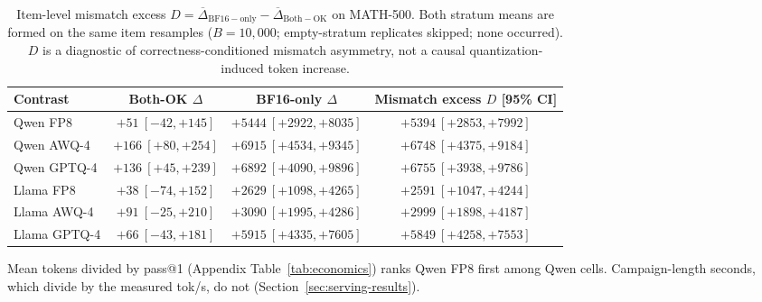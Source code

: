 \documentclass[11pt,a4paper]{article}
\begin{document}
\begin{table}[t]
\centering
\caption{Item-level mismatch excess $D=\overline{\Delta}_{\mathrm{BF16-only}}-\overline{\Delta}_{\mathrm{Both-OK}}$ on MATH-500. Both stratum means are formed on the same item resamples ($B=10{,}000$; empty-stratum replicates skipped; none occurred). $D$ is a diagnostic of correctness-conditioned mismatch asymmetry, not a causal quantization-induced token increase.}
\label{tab:mismatch-excess}
\small
\begin{tabular}{lccc}
\toprule
\textbf{Contrast} & \textbf{Both-OK $\Delta$} & \textbf{BF16-only $\Delta$} & \textbf{Mismatch excess $D$ [95\% CI]} \\
\midrule
Qwen FP8     & $+51\ [-42,+145]$ & $+5444\ [+2922,+8035]$ & $+5394\ [+2853,+7992]$ \\
Qwen AWQ-4   & $+166\ [+80,+254]$ & $+6915\ [+4534,+9345]$ & $+6748\ [+4375,+9184]$ \\
Qwen GPTQ-4  & $+136\ [+45,+239]$ & $+6892\ [+4090,+9896]$ & $+6755\ [+3938,+9786]$ \\
Llama FP8    & $+38\ [-74,+152]$ & $+2629\ [+1098,+4265]$ & $+2591\ [+1047,+4244]$ \\
Llama AWQ-4  & $+91\ [-25,+210]$ & $+3090\ [+1995,+4286]$ & $+2999\ [+1898,+4187]$ \\
Llama GPTQ-4 & $+66\ [-43,+181]$ & $+5915\ [+4335,+7605]$ & $+5849\ [+4258,+7553]$ \\
\bottomrule
\end{tabular}
\end{table}

Mean tokens divided by pass@1 (Appendix Table~\ref{tab:economics}) ranks Qwen FP8 first among Qwen cells. Campaign-length seconds, which divide by the measured tok/s, do not (Section~\ref{sec:serving-results}).
\end{document}
